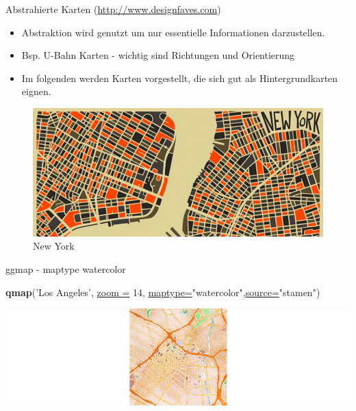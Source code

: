 \documentclass[ignorenonframetext,]{beamer}
\newenvironment{Shaded}{\begin{snugshade}}{\end{snugshade}}
\newcommand{\DataTypeTok}[1]{\textcolor[rgb]{0.74,0.68,0.62}{\underline{#1}}}
\newcommand{\DecValTok}[1]{\textcolor[rgb]{0.27,0.67,0.26}{#1}}
\newcommand{\KeywordTok}[1]{\textcolor[rgb]{0.26,0.66,0.93}{\textbf{#1}}}
\newcommand{\NormalTok}[1]{\textcolor[rgb]{0.74,0.68,0.62}{#1}}
\newcommand{\StringTok}[1]{\textcolor[rgb]{0.02,0.61,0.04}{#1}}
\providecommand{\tightlist}{%
  \setlength{\itemsep}{0pt}\setlength{\parskip}{0pt}}
\begin{document}
\begin{frame}{Abstrahierte Karten
(\href{http://www.designfaves.com/2014/03/abstracted-maps-reveal-cities-personalities}{http://www.designfaves.com})}
\protect\hypertarget{abstrahierte-karten-httpwww.designfaves.com}{}

\begin{itemize}
\tightlist
\item
  Abstraktion wird genutzt um nur essentielle Informationen
  darzustellen.
\item
  Bsp. U-Bahn Karten - wichtig sind Richtungen und Orientierung
\item
  Im folgenden werden Karten vorgestellt, die sich gut als
  Hintergrundkarten eignen.
\end{itemize}

\begin{figure}
\centering
\includegraphics{figure/NYabstracted.jpg}
\caption{New York}
\end{figure}

\end{frame}

\begin{frame}[fragile]{ggmap - maptype watercolor}
\protect\hypertarget{ggmap---maptype-watercolor}{}

\begin{Shaded}
\begin{Highlighting}[]
\KeywordTok{qmap}\NormalTok{(}\StringTok{'Los Angeles'}\NormalTok{, }\DataTypeTok{zoom =} \DecValTok{14}\NormalTok{,}
 \DataTypeTok{maptype=}\StringTok{"watercolor"}\NormalTok{,}\DataTypeTok{source=}\StringTok{"stamen"}\NormalTok{)}
\end{Highlighting}
\end{Shaded}

\includegraphics{figure/lastamen.png}

\end{frame}
\end{document}
